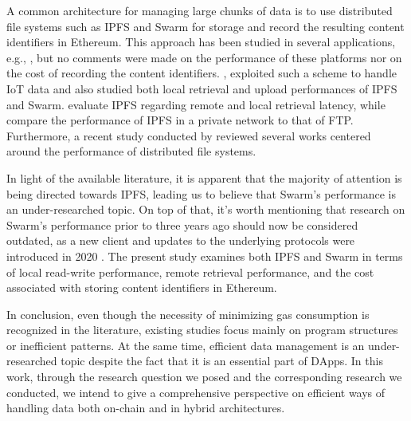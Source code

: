 A common architecture for managing large chunks of data is to use distributed file systems such as IPFS and Swarm for storage and record the resulting content identifiers in Ethereum. This approach has been studied in several applications, e.g., \citep{hao_j_2018, ren_2021}, but no comments were made on the performance of these platforms nor on the cost of recording the content identifiers. \cite{ramesh_2019}, exploited such a scheme to handle IoT data and also studied both local retrieval and upload performances of IPFS and Swarm. \cite{shen_2019} evaluate IPFS regarding remote and local retrieval latency, while \cite{abdullah_2021} compare the performance of IPFS in a private network to that of FTP. Furthermore, a recent study conducted by \cite{aisyah_2022} reviewed several works centered around the performance of distributed file systems. 

In light of the available literature, it is apparent that the majority of attention is being directed towards IPFS, leading us to believe that Swarm’s performance is an under-researched topic. On top of that, it's worth mentioning that research on Swarm's performance prior to three years ago should now be considered outdated, as a new client \citep{swarm_bee} and updates to the underlying protocols were introduced in 2020 \citep{tron_2020}. The present study examines both IPFS and Swarm in terms of local read-write performance, remote retrieval performance, and the cost associated with storing content identifiers in Ethereum.

In conclusion, even though the necessity of minimizing gas consumption is recognized in the literature, existing studies focus mainly on program structures or inefficient patterns. At the same time, efficient data management is an under-researched topic despite the fact that it is an essential part of DApps. In this work, through the research question we posed and the corresponding research we conducted, we intend to give a comprehensive perspective on efficient ways of handling data both on-chain and in hybrid architectures.
